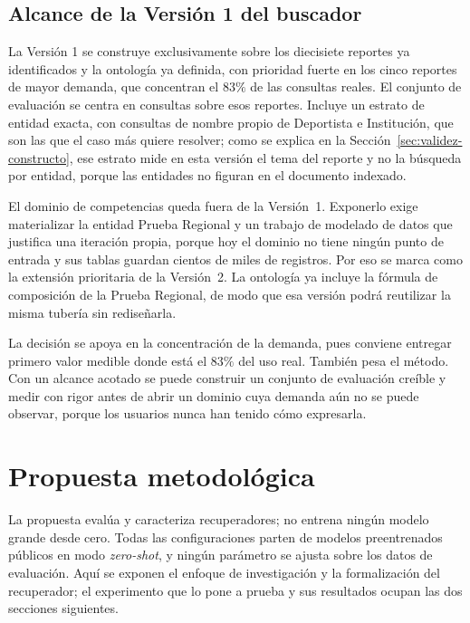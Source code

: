 \documentclass[11pt,letterpaper]{article}
\numberwithin{equation}{section}
\begin{document}
\subsection{Alcance de la Versión 1 del buscador}
\label{sec:alcance}
La Versión 1 se construye exclusivamente sobre los diecisiete reportes ya identificados y la ontología ya definida, con prioridad fuerte en los cinco reportes de mayor demanda, que concentran el $83\%$ de las consultas reales. El conjunto de evaluación se centra en consultas sobre esos reportes. Incluye un estrato de entidad exacta, con consultas de nombre propio de Deportista e Institución, que son las que el caso más quiere resolver; como se explica en la Sección~\ref{sec:validez-constructo}, ese estrato mide en esta versión el tema del reporte y no la búsqueda por entidad, porque las entidades no figuran en el documento indexado.

El dominio de competencias queda fuera de la Versión~1. Exponerlo exige materializar la entidad Prueba Regional y un trabajo de modelado de datos que justifica una iteración propia, porque hoy el dominio no tiene ningún punto de entrada y sus tablas guardan cientos de miles de registros. Por eso se marca como la extensión prioritaria de la Versión~2. La ontología ya incluye la fórmula de composición de la Prueba Regional, de modo que esa versión podrá reutilizar la misma tubería sin rediseñarla.

La decisión se apoya en la concentración de la demanda, pues conviene entregar primero valor medible donde está el $83\%$ del uso real. También pesa el método. Con un alcance acotado se puede construir un conjunto de evaluación creíble y medir con rigor antes de abrir un dominio cuya demanda aún no se puede observar, porque los usuarios nunca han tenido cómo expresarla.

\section{Propuesta metodológica}
\label{sec:propuesta}
La propuesta evalúa y caracteriza recuperadores; no entrena ningún modelo grande desde cero. Todas las configuraciones parten de modelos preentrenados públicos en modo \textit{zero-shot}, y ningún parámetro se ajusta sobre los datos de evaluación. Aquí se exponen el enfoque de investigación y la formalización del recuperador; el experimento que lo pone a prueba y sus resultados ocupan las dos secciones siguientes.
\end{document}
